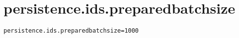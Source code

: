 \section{persistence.ids.preparedbatchsize}
\label{configuration:PersistenceIdsPreparedbatchsize}
\AvailableInJavaOnly{\TODO}
\begin{lstlisting}[style=Props,caption={Usage example for \textit{persistence.ids.preparedbatchsize}}]
persistence.ids.preparedbatchsize=1000
\end{lstlisting}